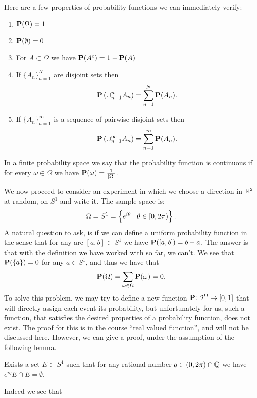 \documentclass[11pt,a4paper]{article}
\begin{document}
  Here are a few properties of probability functions we can immediately 
  verify:
  \begin{enumerate}
    \item $\mathbf{P}(\Omega) = 1$
    \item $\mathbf{P}(\emptyset) = 0$
    \item For $A \subset \Omega$ we have $\mathbf{P}(A^c) = 1 - \mathbf{P}(A)$
    \item If $\{A_n\}_{n=1}^{N}$ are disjoint sets then 
      \[
        \mathbf{P}\left(\cup_{n=1}^{n}{A_n}\right) = 
        \sum_{n=1}^{N}{\mathbf{P}(A_n)}.
      \]
    \item If $\{A_n\}_{n=1}^{\infty}$ is a sequence of pairwise disjoint sets 
      then
      \[
        \mathbf{P}\left(\cup_{n=1}^{\infty}{A_n}\right) = 
        \sum_{n=1}^{\infty}{\mathbf{P}(A_n)}.
      \]
  \end{enumerate}

  In a finite probability space we say that the probability function is
  continuous if for every $\omega \in \Omega$ we have 
  $\mathbf{P}(\omega) = \frac{1}{|\Omega|}$.

  We now proceed to consider an experiment in which we choose a direction in
  $\mathbb{R}^2$ at random, on $S^1$ and write it. The sample space is:
  \[
    \Omega = S^1 = \set{e^{i \theta} \mid \theta \in [0,2 \pi)}.
  \]
  A natural question to ask, is if we can define a uniform probability function
  in the sense that for any arc $[a,b] \subset S^1$ we have 
  $\mathbf{P}([a,b]) = b - a$. The answer is that with the definition we have
  worked with so far, we can't. We see that $\mathbf{P}(\{a\}) = 0$ for 
  any $a \in S^1$, and thus we have that
  \[
    \mathbf{P}(\Omega) = \sum_{\omega \in \Omega}{\mathbf{P}(\omega)} = 0.
  \]
  To solve this problem, we may try to define a new function $\mathbf{P} \colon 
  2^\Omega \to [0,1]$ that will directly assign each event its probability,
  but unfortunately for us, such a function, that satisfies the desired
  properties of a probability function, does not exist. The proof for this
  is in the course ``real valued function'', and will not be discussed here.
  However, we can give a proof, under the assumption of the following lemma.

  \begin{lemma}
    Exists a set $E \subset S^1$ such that for any rational number 
    $q \in (0, 2 \pi) \cap \mathbb{Q}$ we have $e^{i q}E \cap E = \emptyset$.
  \end{lemma}

  Indeed we see that
\end{document}
